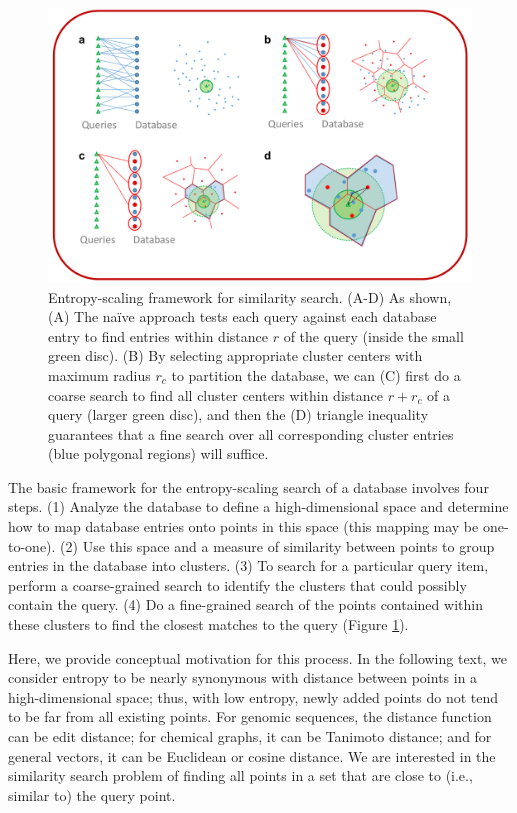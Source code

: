 \documentclass[11pt]{elsarticle}
\theoremstyle{definition}
\theoremstyle{remark}
\numberwithin{equation}{section}
\begin{document}
\begin{figure}[p]
    \centering
    \centerline{\includegraphics[width=8in]{assets/dataStructure.png}}
    \caption{ Entropy-scaling framework for similarity search. %
            (A-D) As shown, %
            (A) The na\"ive approach tests each query against each database entry to find entries within distance $r$ of the query (inside the small green disc). %
            (B) By selecting appropriate cluster centers with maximum radius $r_c$ to partition the database, we can (C) first do a coarse search to find all cluster centers within distance $r+r_c$ of a query (larger green disc), %
 and then the (D) triangle inequality guarantees that a fine search over all corresponding cluster entries (blue polygonal regions) will suffice.}
    \label{fig:dataStructure}
\end{figure}

The basic framework for the entropy-scaling search of a database involves four steps.
(1) Analyze the database to define a high-dimensional space and determine how to map database entries onto points in this space (this mapping may be one-to-one).
(2) Use this space and a measure of similarity between points to group entries in the database into clusters.
(3) To search for a particular query item, perform a coarse-grained search to identify the clusters that could possibly contain the query.
(4) Do a fine-grained search of the points contained within these clusters to find the closest matches to the query (Figure \ref{fig:dataStructure}).

Here, we provide conceptual motivation for this process.
In the following text, we consider entropy to be nearly synonymous with distance between points in a high-dimensional space; thus, with low entropy, newly added points do not tend to be far from all existing points. 
For genomic sequences, the distance function can be edit distance; for chemical graphs, it can be Tanimoto distance; and for general vectors, it can be Euclidean or cosine distance.
We are interested in the similarity search problem of finding all points in a set that are close to (i.e., similar to) the query point.
\end{document}
